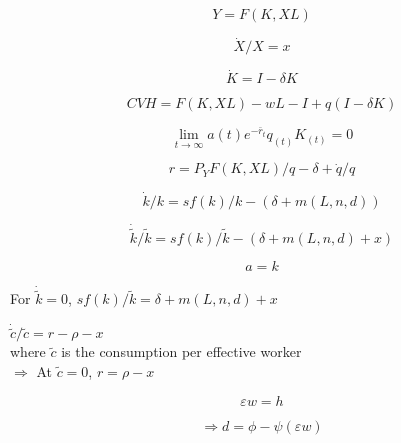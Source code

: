 \documentclass[12pt]{article}%
\begin{document}
\begin{equation}
Y = F(K,XL)
\end{equation}

\begin{equation}
\dot{X}/X = x
\end{equation}

\begin{equation}
\dot{K} = I - \delta K
\end{equation}

\begin{equation}
CVH = F(K,XL) -wL - I + q(I -  \delta K)
\end{equation}

\begin{equation}
\lim_{t\to\infty} a(t) e^{-\bar{r}_{t}} q_{(t)} K_{(t)} = 0
\end{equation}

\begin{equation}
r = P_{Y} F(K,XL) /q - \delta + \dot{q}/q
\end{equation}

\begin{equation}
\dot{k}/k = s f(k) / k - (\delta + m(L,n ,d))
\end{equation}

\begin{equation}
\dot{\tilde{k}}/\tilde k = s f(k) / \tilde k - (\delta + m(L,n ,d) + x)
\end{equation}

\begin{equation}
a = k
\end{equation}

For $\dot{\tilde{k}} = 0$, $s f(k)/\tilde{k} = \delta + m(L,n ,d) + x$

$\dot{\tilde{c}}/\tilde{c} = r - \rho - x$ \\
where $\tilde{c}$ is the consumption per effective worker \\
$\Rightarrow$ At $\tilde{c} = 0$, $r = \rho - x$

\begin{equation}
\varepsilon w = h
\end{equation}

\begin{equation}
\Rightarrow d = \phi - \psi(\varepsilon w)
\end{equation}
\end{document}
